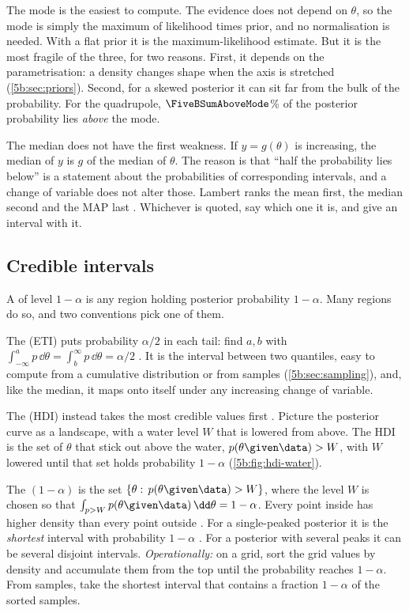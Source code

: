 The mode is the easiest to compute. The evidence does not depend on $\theta$, so the
mode is simply the maximum of likelihood times prior, and no normalisation is needed.
With a flat prior it is the maximum-likelihood estimate. But it is the most fragile of
the three, for two reasons. First, it depends on the parametrisation: a density changes
shape when the axis is stretched (\cref{5b:sec:priors}). Second, for a skewed posterior
it can sit far from the bulk of the probability. For the quadrupole,
$\FiveBSumAboveMode$\% of the posterior probability lies \emph{above} the mode.

The median does not have the first weakness. If $y=g(\theta)$ is increasing, the median
of $y$ is $g$ of the median of $\theta$. The reason is that ``half the probability lies
below'' is a statement about the probabilities of corresponding intervals, and a change
of variable does not alter those. Lambert ranks the mean first, the median second and
the MAP last . Whichever is quoted, say which one it is, and give
an interval with it.

\subsection{Credible intervals}

A  of level $1-\alpha$ is any region holding posterior
probability $1-\alpha$. Many regions do so, and two conventions pick one of them.

The  (ETI) puts probability $\alpha/2$ in each tail: find
$a,b$ with $\int_{-\infty}^ap\,\dd\theta=\int_b^\infty p\,\dd\theta=\alpha/2$
. It is the interval between two quantiles, easy to compute from a
cumulative distribution or from samples (\cref{5b:sec:sampling}), and, like the median,
it maps onto itself under any increasing change of variable.

The  (HDI) instead takes the most credible values
first . Picture the posterior curve as a landscape, with a
water level $W$ that is lowered from above. The HDI is the set of $\theta$ that stick out above the
water, $p(\theta\given\data)>W$, with $W$ lowered until that set holds probability
$1-\alpha$ (\cref{5b:fig:hdi-water}).

\begin{workdef}
The $(1-\alpha)$  is the set $\{\theta:\,p(\theta\given\data)>W\}$, where
the level $W$ is chosen so that $\int_{p>W}p(\theta\given\data)\,\dd\theta=1-\alpha$.
Every point inside has higher density than every point outside
. For a single-peaked posterior it is
the \emph{shortest} interval with probability $1-\alpha$ . For a
posterior with several peaks it can be several disjoint intervals.
\emph{Operationally:} on a grid, sort the grid values by density and accumulate them from
the top until the probability reaches $1-\alpha$. From samples, take the shortest
interval that contains a fraction $1-\alpha$ of the sorted samples.
\end{workdef}

